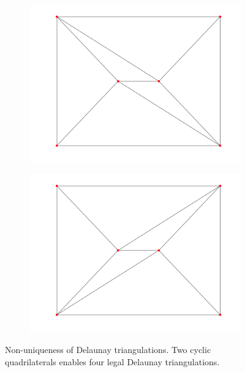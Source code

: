 \begin{figure}[ht]
\begin{subfigure}[b]{0.4\textwidth}
        \centering
        \includegraphics[width=\textwidth]{report/Images/Theory/triangulation/triangulation_delaunay3.png}
        \label{fig:triangulation-delaunay3}
    \end{subfigure}
    \begin{subfigure}[b]{0.4\textwidth}
        \centering
        \includegraphics[width=\textwidth]{report/Images/Theory/triangulation/triangulation_delaunay4.png}
        \label{fig:triangulation-delaunay4}
    \end{subfigure}
    \caption[Non-uniqueness of Delaunay triangulations]{Non-uniqueness of Delaunay triangulations. Two cyclic quadrilaterals enables four legal Delaunay triangulations.}
    \label{fig:non-unique-delaunay}
\end{figure}



